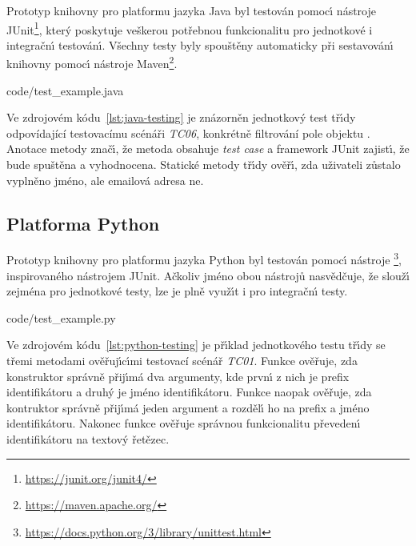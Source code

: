 Prototyp knihovny pro platformu jazyka Java byl testován pomoc\'{\i}
nástroje JUnit\footnote{\url{https://junit.org/junit4/}}, kter\'y poskytuje veškerou potřebnou funkcionalitu pro
jednotkové i integračn\'{\i} testován\'{\i}. Všechny testy byly spouštěny automaticky
při sestavován\'{\i} knihovny pomoc\'{\i} nástroje Maven\footnote{\url{https://maven.apache.org/}}.


{code/test_example.java}

Ve zdrojovém kódu~\ref{lst:java-testing} je znázorněn jednotkov\'y test
tř\'{\i}dy  odpovídající testovacímu scénáři \textit{TC06}, konkrétně
filtrování pole  objektu . Anotace  metody  znač\'{\i},
že metoda obsahuje \textit{test case} a framework JUnit zajist\'{\i}, že bude spuštěna
a vyhodnocena. Statické metody tř\'{\i}dy  ověř\'{\i}, zda uživateli zůstalo
vyplněno jméno, ale emailová adresa ne.

\subsection{Platforma Python}

Prototyp knihovny pro platformu jazyka Python byl testován pomoc\'{\i}
nástroje \footnote{\url{https://docs.python.org/3/library/unittest.html}}, inspirovaného nástrojem
JUnit. Ačkoliv jméno obou nástrojů nasvědčuje, že slouž\'{\i} zejména pro jednotkové testy,
lze je plně využ\'{\i}t i pro integračn\'{\i} testy.


{code/test_example.py}

Ve zdrojovém kódu~\ref{lst:python-testing} je př\'{\i}klad jednotkového testu tř\'{\i}dy
 se třemi metodami ověřuj\'{\i}c\'{\i}mi testovací scénář \textit{TC01}.
Funkce  ověřuje, zda konstruktor správně přij\'{\i}má dva argumenty,
kde prvn\'{\i} z nich je prefix identifikátoru a druh\'y je jméno identifikátoru.
Funkce  naopak ověřuje, zda kontruktor správně přij\'{\i}má jeden
argument a rozděl\'{\i} ho na prefix a jméno identifikátoru.
Nakonec funkce  ověřuje správnou funkcionalitu převeden\'{\i}
identifikátoru na textov\'y řetězec.

